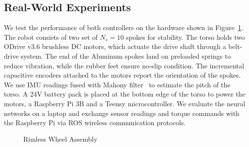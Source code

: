 \subsection{Real-World Experiments}

%
We test the performance of both controllers on the hardware shown in
Figure~\ref{fig:hardware}.
%
The robot consists of two set of $N_s=10$ spokes for stability.
%
The torso holds two ODrive v3.6 brushless DC motors, which actuate the drive
shaft through a belt-drive system.
%
The end of the Aluminum spokes land on preloaded springs to reduce vibration,
while the rubber feet ensure no-slip condition.
%
The incremental capacitive encoders attached to the motors report the
orientation of the spokes.
%
We use IMU readings fused with Mahony filter~\cite{mahony2008nonlinear} to estimate
the pitch of the torso.
%
A 24V battery pack is placed at the bottom edge of the torso to power
the motors, a Raspberry Pi 3B and a Teensy microcontroller.
%
We evaluate the neural networks on a laptop and exchange sensor readings and
torque commands with the Raspberry Pi via ROS wireless communication protocols.

\begin{figure}
    \vspace{-5mm}
     \begin{center}
     \vspace{-5mm}
     \end{center}
     \caption{Rimless Wheel Assembly}
     \label{fig:hardware}
     \vspace{-5mm}
\end{figure}

